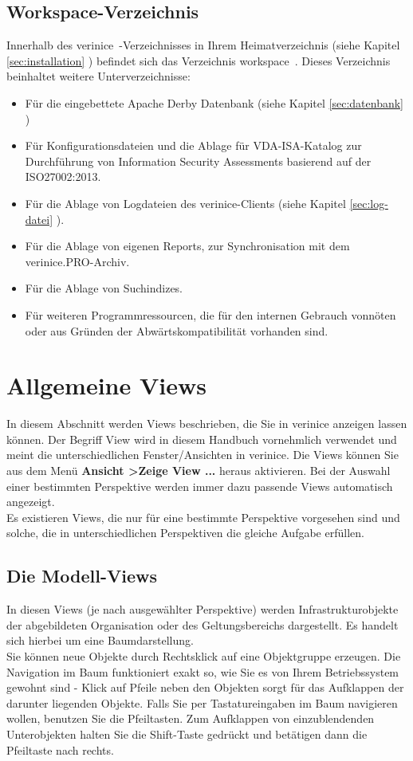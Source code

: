 \documentclass[a4paper,10pt]{book}
\begin{document}
\section{Workspace-Verzeichnis}
Innerhalb des \glqq verinice\grqq \ -Verzeichnisses in Ihrem Heimatverzeichnis (siehe Kapitel \ref{sec:installation} ) befindet sich das Verzeichnis \glqq workspace\grqq \ .
Dieses Verzeichnis beinhaltet weitere Unterverzeichnisse:
\begin{itemize}
\item Für die eingebettete Apache Derby Datenbank (siehe Kapitel \ref{sec:datenbank} )
\item Für Konfigurationsdateien und die Ablage für VDA-ISA-Katalog zur Durchführung von Information Security Assessments basierend auf der ISO27002:2013.
\item Für die Ablage von Logdateien des verinice-Clients (siehe Kapitel \ref{sec:log-datei} ).
\item Für die Ablage von eigenen Reports, zur Synchronisation mit dem verinice.PRO-Archiv.
\item Für die Ablage von Suchindizes.
\item Für weiteren Programmressourcen, die für den internen Gebrauch vonnöten oder aus Gründen der Abwärtskompatibilität vorhanden sind.
\end{itemize}


\chapter{Allgemeine Views}
In diesem Abschnitt werden Views beschrieben, die Sie in verinice anzeigen lassen können. Der Begriff View wird in diesem
Handbuch vornehmlich verwendet und meint die unterschiedlichen Fenster/Ansichten in verinice. Die Views können Sie aus dem Menü
\textbf{Ansicht \textgreater Zeige View ...} heraus aktivieren. Bei der Auswahl einer bestimmten Perspektive werden immer dazu passende Views automatisch angezeigt.
\newline\\
Es existieren Views, die nur für eine bestimmte Perspektive vorgesehen sind und solche, die in unterschiedlichen Perspektiven die gleiche Aufgabe erfüllen.

\section{Die Modell-Views}
In diesen Views (je nach ausgewählter Perspektive) werden Infrastrukturobjekte der abgebildeten Organisation oder des Geltungsbereichs dargestellt.
Es handelt sich hierbei um eine Baumdarstellung.
\newline\\
Sie können neue Objekte durch Rechtsklick auf eine Objektgruppe erzeugen. Die Navigation im Baum funktioniert exakt so, wie Sie es von Ihrem
Betriebssystem gewohnt sind - Klick auf Pfeile neben den Objekten sorgt für das Aufklappen der darunter liegenden Objekte. Falls Sie per
Tastatureingaben im Baum navigieren wollen, benutzen Sie die Pfeiltasten. Zum Aufklappen von einzublendenden Unterobjekten halten Sie die Shift-Taste
gedrückt und betätigen dann die Pfeiltaste nach rechts.
\end{document}
